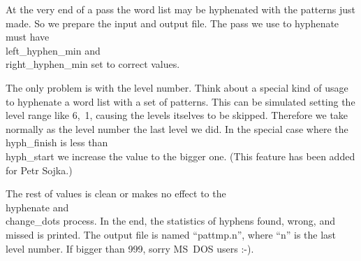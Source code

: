 At the very end of a pass the word list may be hyphenated with the
patterns just made. So we prepare the input and output file. The pass we
use to hyphenate must have \\{left\_hyphen\_min} and \\{right\_hyphen\_min} set
to correct values.

The only problem is with the level number. Think about a special kind of
usage to hyphenate a word list with a set of patterns. This can be
simulated setting the level range like 6,~1, causing the levels itselves to
be skipped. Therefore we take normally as the level number the last level
we did. In the special case where the \\{hyph\_finish} is less than
\\{hyph\_start} we increase the value to the bigger one. (This feature has
been added for Petr Sojka.)

The rest of values is clean or makes no
effect to the \\{hyphenate} and \\{change\_dots} process. In the end, the
statistics of hyphens found, wrong, and missed is printed.
The output file is named ``pattmp.n'', where ``n'' is the last level
number. If bigger than 999, sorry MS~DOS users :-).

